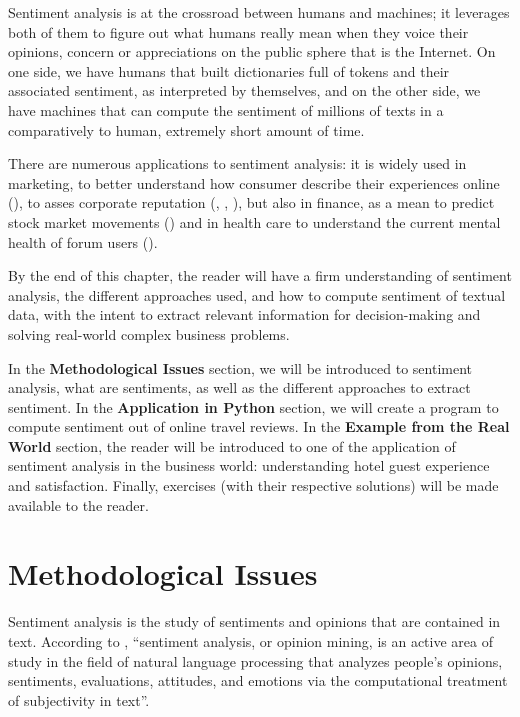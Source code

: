 	Sentiment analysis is at the crossroad between humans and machines; it leverages both of them to figure out what humans really mean when they voice their opinions, concern or appreciations on the public sphere that is the Internet. On one side, we have humans that built dictionaries full of tokens and their associated sentiment, as interpreted by themselves, and on the other side, we have machines that can compute the sentiment of millions of texts in a comparatively to human, extremely short amount of time.

	There are numerous applications to sentiment analysis: it is widely used in marketing, to better understand how consumer describe their experiences online (\citealp{xiang_what_2015}), to asses corporate reputation (\citealp{oconnor_managing_2010}, \citealp{vidya_twitter_2015}, \citealp{chung_evolution_2019}), but also in finance, as a mean to predict stock market movements (\citealp{mohan_stock_2019}) and in health care to understand the current mental health of forum users (\citealp{davcheva_user_2019}).

	By the end of this chapter, the reader will have a firm understanding of sentiment analysis, the different approaches used, and how to compute sentiment of textual data, with the intent to extract relevant information for decision-making and solving real-world complex business problems.

	In the \textbf{Methodological Issues} section, we will be introduced to sentiment analysis, what are sentiments, as well as the different approaches to extract sentiment. In the \textbf{Application in Python} section, we will create a program to compute sentiment out of online travel reviews. In the \textbf{Example from the Real World} section, the reader will be introduced to one of the application of sentiment analysis in the business world: understanding hotel guest experience and satisfaction. Finally, exercises (with their respective solutions) will be made available to the reader.
	\section{Methodological Issues}

	Sentiment analysis is the study of sentiments and opinions that are contained in text. According to \citep{hutto_vader_2014}, ``sentiment analysis, or opinion mining, is an active area of study in the field of natural language processing that analyzes people's opinions, sentiments, evaluations, attitudes, and emotions via the computational treatment of subjectivity in text''.

